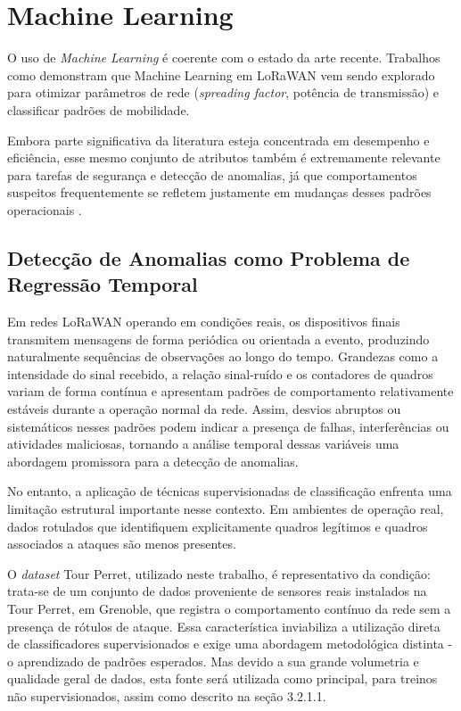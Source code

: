 
\section{Machine Learning}

O uso de \textit{Machine Learning} é coerente com o estado da arte recente. 
Trabalhos como \cite{farhad2023} demonstram que Machine Learning em 
LoRaWAN vem sendo explorado para otimizar parâmetros de rede 
(\textit{spreading factor}, potência de transmissão) e classificar padrões 
de mobilidade.

 Embora parte significativa da literatura esteja concentrada em 
desempenho e eficiência, esse mesmo conjunto de atributos também é 
extremamente relevante para tarefas de segurança e detecção de anomalias, 
já que comportamentos suspeitos frequentemente se refletem justamente em 
mudanças desses padrões operacionais \cite{farhad2023, vangelista2023}.


\subsection{Detecção de Anomalias como Problema de Regressão Temporal}

Em redes LoRaWAN operando em condições reais, os dispositivos finais 
transmitem mensagens de forma periódica ou orientada a evento, produzindo 
naturalmente sequências de observações ao longo do tempo. Grandezas como a 
intensidade do sinal recebido, a relação sinal-ruído e os contadores de 
quadros variam de forma contínua e apresentam padrões de comportamento 
relativamente estáveis durante a operação normal da rede. Assim, desvios 
abruptos ou sistemáticos nesses padrões podem indicar a presença de falhas, 
interferências ou atividades maliciosas, tornando a análise temporal dessas 
variáveis uma abordagem promissora para a detecção de anomalias.

No entanto, a aplicação de técnicas supervisionadas de classificação enfrenta 
uma limitação estrutural importante nesse contexto. Em ambientes de operação 
real, dados rotulados que identifiquem explicitamente quadros legítimos e 
quadros associados a ataques são menos presentes.

 O \textit{dataset} Tour Perret, 
utilizado neste trabalho, é representativo da condição: trata-se de um 
conjunto de dados proveniente de sensores reais instalados na Tour Perret, 
em Grenoble, que registra o comportamento contínuo da rede sem a presença 
de rótulos de ataque. Essa característica inviabiliza a utilização direta 
de classificadores supervisionados e exige uma abordagem metodológica 
distinta - o aprendizado de padrões esperados. Mas devido a sua grande volumetria e qualidade geral de dados, esta fonte será utilizada como principal, para treinos não supervisionados, assim como descrito na seção 3.2.1.1.


